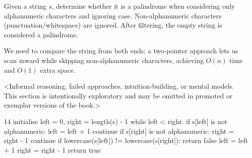 %


\label{prob:lc-125-valid-palindrome}

\ProblemSummary
Given a string $s$, determine whether it is a palindrome when considering only alphanumeric characters and ignoring case.
Non-alphanumeric characters (punctuation/whitespace) are ignored. After filtering, the empty string is considered a palindrome.

\KeyIdea
We need to compare the string from both ends; a two-pointer approach lets us scan inward while skipping non-alphanumeric characters, achieving $O(n)$ time and $O(1)$ extra space.

\begin{Thinking}
<Informal reasoning, failed approaches, intuition-building, or mental models.
This section is intentionally exploratory and may be omitted in promoted or
exemplar versions of the book.>
\end{Thinking}

\Algorithm
\begin{CodeBlock}[style=pseudo,caption={Pseudocode}]{14}
    initialise left = 0, right = length(s) - 1
    while left < right:
        if s[left] is not alphanumeric:
            left = left + 1
            continue
        if s[right] is not alphanumeric:
            right = right - 1
            continue
        if lowercase(s[left]) != lowercase(s[right]):
            return false
        left = left + 1
        right = right - 1
    return true
\end{CodeBlock}

